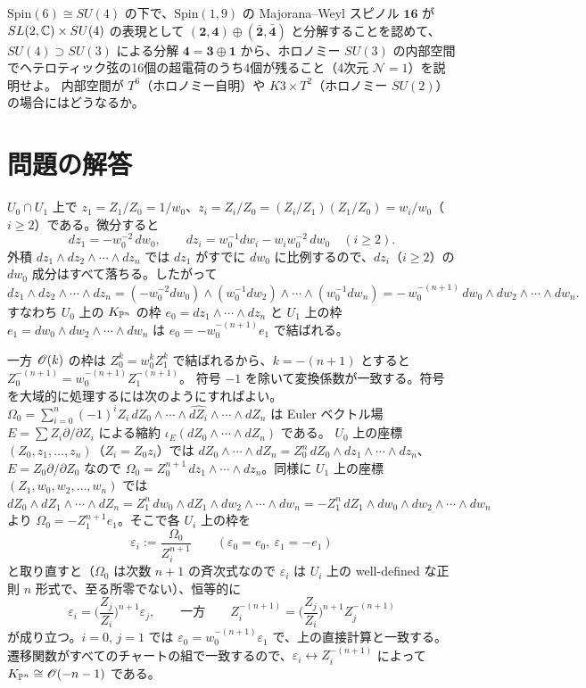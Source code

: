 $\mathrm{Spin}(6)\cong SU(4)$ の下で、$\mathrm{Spin}(1,9)$ の Majorana--Weyl スピノル $\mathbf{16}$ が $SL(2,\mathbb{C})\times SU(4)$ の表現として $(\mathbf2,\mathbf4)\oplus(\bar{\mathbf2},\bar{\mathbf4})$ と分解することを認めて、
$SU(4)\supset SU(3)$ による分解 $\mathbf4 = \mathbf3\oplus\mathbf1$ から、ホロノミー $SU(3)$ の内部空間でヘテロティック弦の16個の超電荷のうち4個が残ること（4次元 $\mathcal N=1$）を説明せよ。
内部空間が $T^6$（ホロノミー自明）や $K3\times T^2$（ホロノミー $SU(2)$）の場合にはどうなるか。

\section*{問題の解答}

$U_0\cap U_1$ 上で $z_1 = Z_1/Z_0 = 1/w_0$、$z_i = Z_i/Z_0 = (Z_i/Z_1)(Z_1/Z_0) = w_i/w_0$（$i\ge2$）である。微分すると
\[
dz_1 = -w_0^{-2}\,dw_0,\qquad dz_i = w_0^{-1}dw_i - w_iw_0^{-2}\,dw_0\quad(i\ge2).
\]
外積 $dz_1\wedge dz_2\wedge\cdots\wedge dz_n$ では $dz_1$ がすでに $dw_0$ に比例するので、$dz_i$（$i\ge 2$）の $dw_0$ 成分はすべて落ちる。したがって
\[
dz_1\wedge dz_2\wedge\cdots\wedge dz_n = (-w_0^{-2}dw_0)\wedge(w_0^{-1}dw_2)\wedge\cdots\wedge(w_0^{-1}dw_n)
= -\,w_0^{-(n+1)}\,dw_0\wedge dw_2\wedge\cdots\wedge dw_n .
\]
すなわち $U_0$ 上の $K_{\mathbb{P}^n}$ の枠 $e_0 = dz_1\wedge\cdots\wedge dz_n$ と $U_1$ 上の枠 $e_1 = dw_0\wedge dw_2\wedge\cdots\wedge dw_n$ は $e_0 = -w_0^{-(n+1)}e_1$ で結ばれる。

一方 $\mathscr{O}(k)$ の枠は $Z_0^k = w_0^kZ_1^k$ で結ばれるから、$k = -(n+1)$ とすると $Z_0^{-(n+1)} = w_0^{-(n+1)}Z_1^{-(n+1)}$。
符号 $-1$ を除いて変換係数が一致する。符号を大域的に処理するには次のようにすればよい。
$\Omega_0 = \sum_{i=0}^n(-1)^iZ_i\,dZ_0\wedge\cdots\wedge\widehat{dZ_i}\wedge\cdots\wedge dZ_n$ は Euler ベクトル場 $E = \sum Z_i\partial/\partial Z_i$ による縮約 $\iota_E(dZ_0\wedge\cdots\wedge dZ_n)$ である。
$U_0$ 上の座標 $(Z_0,z_1,\dots,z_n)$（$Z_i = Z_0z_i$）では $dZ_0\wedge\cdots\wedge dZ_n = Z_0^n\,dZ_0\wedge dz_1\wedge\cdots\wedge dz_n$、$E = Z_0\partial/\partial Z_0$ なので
$\Omega_0 = Z_0^{n+1}\,dz_1\wedge\cdots\wedge dz_n$。同様に $U_1$ 上の座標 $(Z_1,w_0,w_2,\dots,w_n)$ では
$dZ_0\wedge dZ_1\wedge\cdots\wedge dZ_n = Z_1^n\,dw_0\wedge dZ_1\wedge dw_2\wedge\cdots\wedge dw_n = -Z_1^n\,dZ_1\wedge dw_0\wedge dw_2\wedge\cdots\wedge dw_n$ より
$\Omega_0 = -Z_1^{n+1}e_1$。そこで各 $U_i$ 上の枠を
\[
\varepsilon_i := \frac{\Omega_0}{Z_i^{n+1}}\qquad(\varepsilon_0 = e_0,\ \varepsilon_1 = -e_1)
\]
と取り直すと（$\Omega_0$ は次数 $n+1$ の斉次式なので $\varepsilon_i$ は $U_i$ 上の well-defined な正則 $n$ 形式で、至る所零でない）、恒等的に
\[
\varepsilon_i = \Big(\frac{Z_j}{Z_i}\Big)^{n+1}\varepsilon_j ,\qquad\text{一方}\qquad Z_i^{-(n+1)} = \Big(\frac{Z_j}{Z_i}\Big)^{n+1}Z_j^{-(n+1)}
\]
が成り立つ。$i=0$, $j=1$ では $\varepsilon_0 = w_0^{-(n+1)}\varepsilon_1$ で、上の直接計算と一致する。
遷移関数がすべてのチャートの組で一致するので、$\varepsilon_i\leftrightarrow Z_i^{-(n+1)}$ によって $K_{\mathbb{P}^n}\cong\mathscr{O}(-n-1)$ である。

